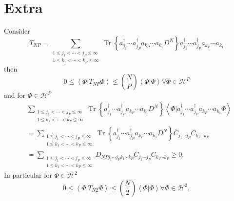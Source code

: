 \documentclass[aps,preprint]{revtex4}%
\begin{document}
\section{Extra}

Consider
\begin{equation}
T_{NP}=\sum_{\substack{1\leq j_{1}<\cdots<j_{P}\leq\infty\\1\leq k_{1}%
<\cdots<k_{P}\leq\infty}}\operatorname{Tr}\left\{  a_{j_{1}}^{\dagger}\cdots
a_{j_{P}}^{\dagger}a_{k_{P}}\cdots a_{k_{1}}D^{N}\right\}  a_{j_{1}}^{\dagger
}\cdots a_{j_{P}}^{\dagger}a_{k_{P}}\cdots a_{k_{1}}%
\end{equation}
then
\begin{equation}
0\leq\left\langle \left.  \Phi\right\vert T_{NP}\Phi\right\rangle \leq
\binom{N}{P}\left\langle \left.  \Phi\right\vert \Phi\right\rangle \text{
}\forall\Phi\in\mathcal{H}^{P}%
\end{equation}
and for $\Phi\in\mathcal{H}^{P}$
\begin{align}
&  \sum_{\substack{1\leq j_{1}<\cdots<j_{P}\leq\infty\\1\leq k_{1}%
<\cdots<k_{P}\leq\infty}}\operatorname{Tr}\left\{  a_{j_{1}}^{\dagger}\cdots
a_{j_{P}}^{\dagger}a_{k_{P}}\cdots a_{k_{1}}D^{N}\right\}  \left\langle
\left.  \Phi\right\vert a_{j_{1}}^{\dagger}\cdots a_{j_{P}}^{\dagger}a_{k_{P}%
}\cdots a_{k_{1}}\Phi\right\rangle \\
&  =\sum_{\substack{1\leq j_{1}<\cdots<j_{P}\leq\infty\\1\leq k_{1}%
<\cdots<k_{P}\leq\infty}}\operatorname{Tr}\left\{  a_{j_{1}}^{\dagger}\cdots
a_{j_{P}}^{\dagger}a_{k_{P}}\cdots a_{k_{1}}D^{N}\right\}  \bar{C}%
_{j_{1}\cdots j_{P}}C_{k_{1}\cdots k_{P}}\\
&  =\sum_{\substack{1\leq j_{1}<\cdots<j_{P}\leq\infty\\1\leq k_{1}%
<\cdots<k_{P}\leq\infty}}D_{NPj_{1}\cdots j_{P}k_{1}\cdots k_{P}}\bar
{C}_{j_{1}\cdots j_{P}}C_{k_{1}\cdots k_{P}}\geq0.
\end{align}
In particular for $\Phi\in\mathcal{H}^{2}$
\begin{equation}
0\leq\left\langle \left.  \Phi\right\vert T_{N2}\Phi\right\rangle \leq
\binom{N}{2}\left\langle \left.  \Phi\right\vert \Phi\right\rangle \text{
}\forall\Phi\in\mathcal{H}^{2},
\end{equation}%
\end{document}
